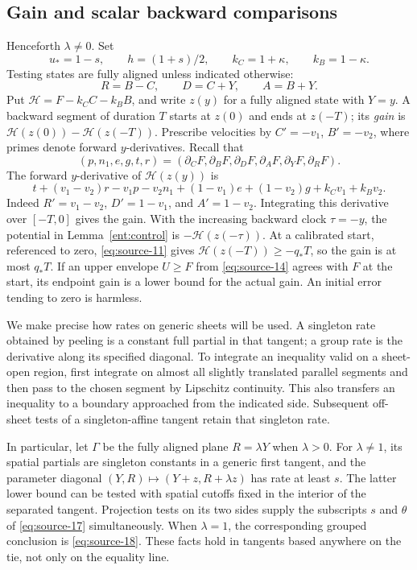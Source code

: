 \subsection{Gain and scalar backward comparisons}

Henceforth \(\lambda\ne0\). Set
\[
u_*=1-s,\qquad h=(1+s)/2,\qquad
k_C=1+\kappa,\qquad k_B=1-\kappa.
\]
Testing states are fully aligned unless indicated otherwise:
\[
R=B-C,\qquad D=C+Y,\qquad A=B+Y.
\]
Put \(\mathcal H=F-k_CC-k_BB\), and write \(z(y)\) for a fully aligned
state with \(Y=y\). A backward segment of duration \(T\) starts at
\(z(0)\) and ends at \(z(-T)\); its \emph{gain} is
\(\mathcal H(z(0))-\mathcal H(z(-T))\).
Prescribe velocities by \(C'=-v_1\), \(B'=-v_2\), where primes denote
forward \(y\)-derivatives. Recall that
\[
(p,n_1,e,g,t,r)
=(\partial_CF,\partial_BF,\partial_DF,\partial_AF,
  \partial_YF,\partial_RF).
\]
The forward \(y\)-derivative of \(\mathcal H(z(y))\) is
\begin{equation}\label{eq:source-19}
t+(v_1-v_2)r-v_1p-v_2n_1
 +(1-v_1)e+(1-v_2)g+k_Cv_1+k_Bv_2.
\end{equation}
Indeed \(R'=v_1-v_2\), \(D'=1-v_1\), and \(A'=1-v_2\).
Integrating this derivative over \([-T,0]\) gives the gain. With the
increasing backward clock \(\tau=-y\), the potential in
Lemma~\ref{ent:control} is \(-\mathcal H(z(-\tau))\).
At a calibrated start, referenced to zero, \eqref{eq:source-11} gives
\(\mathcal H(z(-T))\ge-q_*T\), so the gain is at most \(q_*T\).
If an upper envelope \(U\ge F\) from \eqref{eq:source-14} agrees with
\(F\) at the start, its endpoint gain is a lower bound for the actual
gain. An initial error tending to zero is harmless.

We make precise how rates on generic sheets will be used. A singleton
rate obtained by peeling is a constant full partial in that tangent; a
group rate is the derivative along its specified diagonal. To integrate
an inequality valid on a sheet-open region, first integrate on almost all
slightly translated parallel segments and then pass to the chosen segment
by Lipschitz continuity. This also transfers an inequality to a boundary
approached from the indicated side. Subsequent off-sheet tests of a
singleton-affine tangent retain that singleton rate.

In particular, let \(\Gamma\) be the fully aligned plane
\(R=\lambda Y\) when \(\lambda>0\). For \(\lambda\ne1\), its spatial
partials are singleton constants in a generic first tangent, and the
parameter diagonal \((Y,R)\mapsto(Y+z,R+\lambda z)\) has rate at least
\(s\). The latter lower bound can be tested with spatial cutoffs fixed
in the interior of the separated tangent. Projection tests on its two
sides supply the subscripts \(s\) and \(\theta\) of
\eqref{eq:source-17} simultaneously. When \(\lambda=1\), the corresponding
grouped conclusion is \eqref{eq:source-18}. These facts hold in tangents
based anywhere on the tie, not only on the equality line.

